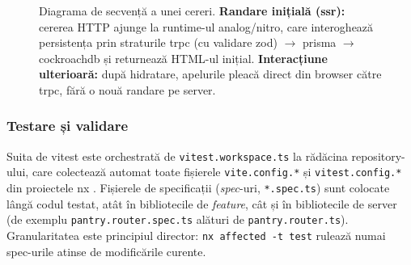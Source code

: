 \begin{figure}[htbp]
  \centering
  \caption[Diagrama de secvență a unei cereri]{Diagrama de secvență a unei
    cereri. \textbf{Randare inițială (\acrshort{ssr}):} cererea HTTP ajunge la
    runtime-ul \gls{analog}/\gls{nitro}, care interoghează persistența prin
    straturile \gls{trpc} (cu validare \gls{zod}) \(\rightarrow\) \gls{prisma}
    \(\rightarrow\) \gls{cockroachdb} și returnează HTML-ul inițial.
    \textbf{Interacțiune ulterioară:} după hidratare, apelurile pleacă direct
    din browser către \gls{trpc}, fără o nouă randare pe server.}
  \label{fig:flux-executie}
\end{figure}

\subsubsection{Testare și validare}\label{subsec:testare-validare}

Suita de \gls{vitest} este orchestrată de \texttt{vitest.workspace.ts} la rădăcina repository-ului, care colectează automat toate fișierele \texttt{vite.config.*} și \texttt{vitest.config.*} din proiectele \gls{nx} \cite{vitest,vite}. Fișierele de specificații (\textit{spec}-uri, \texttt{*.spec.ts}) sunt colocate lângă codul testat, atât în bibliotecile de \textit{feature}, cât și în bibliotecile de server (de exemplu \texttt{pantry.router.spec.ts} alături de \texttt{pantry.router.ts}). Granularitatea este principiul director: \texttt{nx affected -t test} rulează numai spec-urile atinse de modificările curente.

